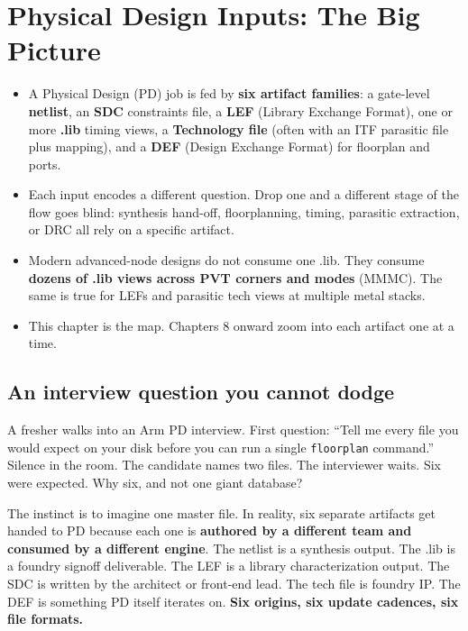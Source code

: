\chapter{Physical Design Inputs: The Big Picture}

\begin{tldr}
\begin{itemize}[leftmargin=1.2em]
  \item A Physical Design (PD) job is fed by \textbf{six artifact families}: a gate-level \textbf{netlist}, an \textbf{SDC} constraints file, a \textbf{LEF} (Library Exchange Format), one or more \textbf{.lib} timing views, a \textbf{Technology file} (often with an ITF parasitic file plus mapping), and a \textbf{DEF} (Design Exchange Format) for floorplan and ports.
  \item Each input encodes a different question. Drop one and a different stage of the flow goes blind: synthesis hand-off, floorplanning, timing, parasitic extraction, or DRC all rely on a specific artifact.
  \item Modern advanced-node designs do not consume one .lib. They consume \textbf{dozens of .lib views across PVT corners and modes} (MMMC). The same is true for LEFs and parasitic tech views at multiple metal stacks.
  \item This chapter is the map. Chapters 8 onward zoom into each artifact one at a time.
\end{itemize}
\end{tldr}

\section*{An interview question you cannot dodge}

\begin{hook}[Hook]
A fresher walks into an Arm PD interview. First question: ``Tell me every file you would expect on your disk before you can run a single \texttt{floorplan} command.'' Silence in the room. The candidate names two files. The interviewer waits. Six were expected. Why six, and not one giant database?
\end{hook}

The instinct is to imagine one master file. In reality, six separate artifacts get handed to PD because each one is \textbf{authored by a different team and consumed by a different engine}. The netlist is a synthesis output. The .lib is a foundry signoff deliverable. The LEF is a library characterization output. The SDC is written by the architect or front-end lead. The tech file is foundry IP. The DEF is something PD itself iterates on. \textbf{Six origins, six update cadences, six file formats.}

